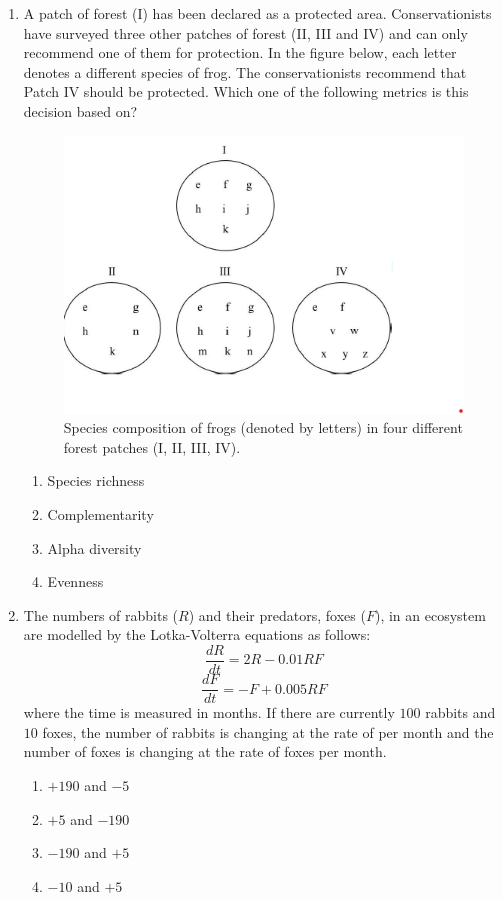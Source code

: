 \documentclass[journal]{IEEEtran}
\begin{document}
\begin{enumerate}
    \item A patch of forest (I) has been declared as a protected area.
Conservationists have surveyed three other patches of forest (II, III and IV) and can only recommend one of them for protection.
In the figure below, each letter denotes a different species of frog.
The conservationists recommend that Patch IV should be protected. Which one of the following metrics is this decision based on?
\begin{figure}[!h]
        \centering
        \includegraphics[width=0.4\columnwidth]{figs/Q.50.png}
        \caption{Species composition of frogs (denoted by letters) in four different forest patches (I, II, III, IV).}
        \label{fig:Q.50}
    \end{figure}
    \begin{multicols}{2}
    \begin{enumerate}
        \item Species richness
        \item Complementarity
        \item Alpha diversity
        \item Evenness
    \end{enumerate}
    \end{multicols}
    
    \item The numbers of rabbits ($R$) and their predators, foxes ($F$), in an ecosystem are modelled by the 
Lotka-Volterra equations as follows:
    $$ \frac{dR}{dt} = 2R - 0.01 RF $$
    $$ \frac{dF}{dt} = -F + 0.005 RF $$
    where the time is measured in months.
If there are currently $100$ rabbits and $10$ foxes, the number of rabbits is changing at the rate of \underline{\hspace{2cm}} per month and the number of foxes is changing at the rate of \underline{\hspace{2cm}} foxes per month.
\begin{multicols}{2}
    \begin{enumerate}
        \item $+190$ and $-5$
        \item $+5$ and $-190$
        \item $-190$ and $+5$
        \item $-10$ and $+5$
    \end{enumerate}
    \end{multicols}


\end{enumerate}
\end{document}
